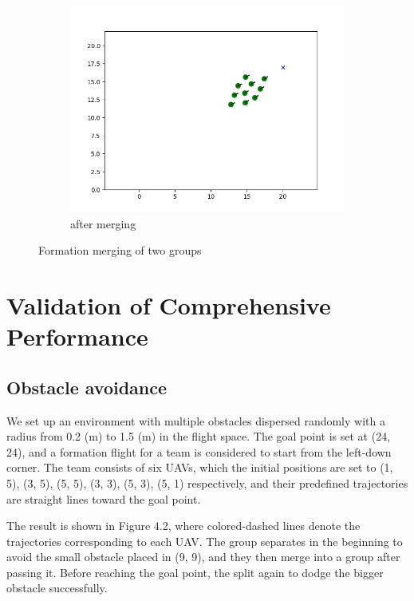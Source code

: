 \begin{figure}[htbp]
\begin{subfigure}[b]{0.3\textwidth}
         \centering
         \includegraphics[width=\textwidth]{figures/merge_3.png}
         \caption{after merging}
         \label{fig:five over x}
     \end{subfigure}
        \caption{Formation merging of two groups}
        \label{fig:three graphs}
\end{figure}

\section{Validation of Comprehensive Performance}
\subsection{Obstacle avoidance}
We set up an environment with multiple obstacles dispersed randomly with a radius from 0.2 (m) to 1.5 (m) in the flight space. The goal point is set at (24, 24), and a formation flight for a team is considered to start from the left-down corner. The team consists of six UAVs, which the initial positions are set to (1, 5), (3, 5), (5, 5), (3, 3), (5, 3), (5, 1) respectively, and their predefined trajectories are straight lines toward the goal point.

The result is shown in Figure 4.2, where colored-dashed lines denote the trajectories corresponding to each UAV. The group separates in the beginning to avoid the small obstacle placed in (9, 9), and they then merge into a group after passing it. Before reaching the goal point, the split again to dodge the bigger obstacle successfully.

